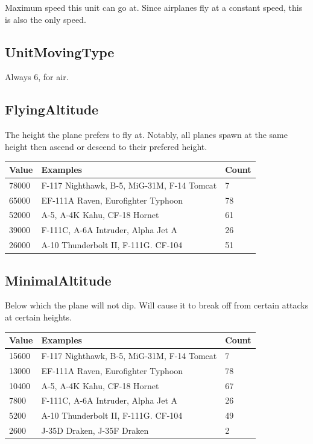 \documentclass{article}
\begin{document}
Maximum speed this unit can go at. Since airplanes fly at a constant speed, this is also the only speed.

\subsection{UnitMovingType}

Always 6, for air.

\subsection{FlyingAltitude}

The height the plane prefers to fly at. Notably, all planes spawn at the same height then ascend or descend to their prefered height.

\begin{center}
    \begin{tabular}{ | l | l | l |}
    \hline
	Value & Examples & Count\\ \hline
	78000 & F-117 Nighthawk, B-5, MiG-31M, F-14 Tomcat & 7\\
	65000 & EF-111A Raven, Eurofighter Typhoon & 78\\
	52000 & A-5, A-4K Kahu, CF-18 Hornet & 61\\
	39000 & F-111C, A-6A Intruder, Alpha Jet A & 26\\
	26000 & A-10 Thunderbolt II, F-111G. CF-104 & 51\\
    \hline
    \end{tabular}
\end{center}


\subsection{MinimalAltitude}

Below which the plane will not dip. Will cause it to break off from certain attacks at certain heights.

\begin{center}
    \begin{tabular}{ | l | l | l |}
    \hline
	Value & Examples & Count\\ \hline
	15600 &  F-117 Nighthawk, B-5, MiG-31M, F-14 Tomcat & 7\\
	13000 & EF-111A Raven, Eurofighter Typhoon & 78\\
	10400 & A-5, A-4K Kahu, CF-18 Hornet & 67\\
	7800 & F-111C, A-6A Intruder, Alpha Jet A & 26\\
	5200 & A-10 Thunderbolt II, F-111G. CF-104 & 49\\
	2600 & J-35D Draken, J-35F Draken & 2\\
    \hline
    \end{tabular}
\end{center}
\end{document}
